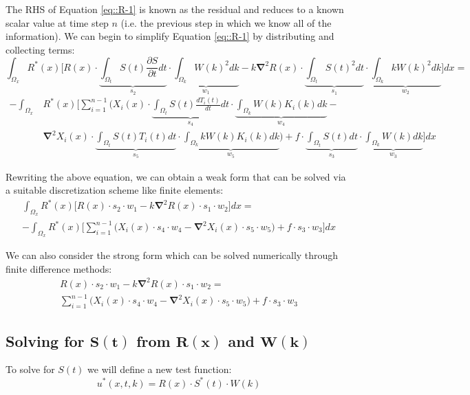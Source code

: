 \documentclass{article}
\def\ds{\displaystyle}
\def\pd{\partial}
\def\grad{\mathbf\nabla}
\begin{document}
The RHS of Equation \ref{eq::R-1} is known as the residual and reduces to a known scalar value at time step $n$ (i.e. the previous step in which we know all of the information). We can begin to simplify Equation \ref{eq::R-1} by distributing and collecting terms:
\begin{equation*}
\ds\int_{\Omega_x} R^*(x) \Bigg[ R(x)\cdot \underbrace{\ds\int_{\Omega_t} S(t)\frac{\pd S}{\pd t}dt}_{s_2} \cdot \underbrace{\ds\int_{\Omega_k} W(k)^2 dk}_{w_1} - k\grad^2 R(x) \cdot \underbrace{\ds\int_{\Omega_t} S(t)^2 dt}_{s_1} \cdot \underbrace{\ds\int_{\Omega_k} kW(k)^2 dk}_{w_2} \Bigg] dx = 
\end{equation*}\vspace{-15pt}
\begin{align}
-\ds\int_{\Omega_x}& R^*(x) \Bigg[ \ds\sum_{i=1}^{n-1} \bigg(X_i(x) \cdot \underbrace{\ds\int_{\Omega_t} S(t)\frac{dT_i(t)}{dt} dt}_{s_4} \cdot \underbrace{\ds\int_{\Omega_k}W(k)K_i(k) dk}_{w_4} - \nonumber \\
& \grad^2X_i(x) \cdot \underbrace{\ds\int_{\Omega_t}S(t)T_i(t) dt}_{s_5} \cdot \underbrace{\ds\int_{\Omega_k}kW(k)K_i(k)dk}_{w_5} \bigg) + f \cdot \underbrace{\ds\int_{\Omega_t} S(t) dt}_{s_3} \cdot \underbrace{\ds\int_{\Omega_k} W(k)dk}_{w_3} \Bigg] dx
\end{align}

Rewriting the above equation, we can obtain a weak form that can be solved via a suitable discretization scheme like finite elements:
\begin{gather}
\ds\int_{\Omega_x} R^*(x) \Bigg[ R(x)\cdot s_2 \cdot w_1 - k\grad^2 R(x) \cdot s_1 \cdot w_2 \Bigg] dx = \nonumber \\
 -  \ds\int_{\Omega_x} R^*(x) \Bigg[ \ds\sum_{i=1}^{n-1} \bigg(X_i(x) \cdot s_4 \cdot w_4 - \grad^2X_i(x) \cdot s_5 \cdot w_5 \bigg) + f \cdot s_3 \cdot w_3 \Bigg] dx
\end{gather}

We can also consider the strong form which can be solved numerically through finite difference methods:
\begin{gather}
\label{eq::R-strong}
R(x)\cdot s_2 \cdot w_1 - k\grad^2 R(x) \cdot s_1 \cdot w_2 =  \nonumber \\
\ds\sum_{i=1}^{n-1} \bigg(X_i(x) \cdot s_4 \cdot w_4 - \grad^2X_i(x) \cdot s_5 \cdot w_5 \bigg) + f \cdot s_3 \cdot w_3 
\end{gather}

\subsection{Solving for $\mathbf{S(t)}$ from $\mathbf{R(x)}$ and $\mathbf{W(k)}$}
To solve for $S(t)$ we will define a new test function:
\begin{equation}
\label{eq::R-TestFctn-2}
u^*(x,t,k) = R(x) \cdot S^*(t) \cdot W(k)
\end{equation}
\end{document}
